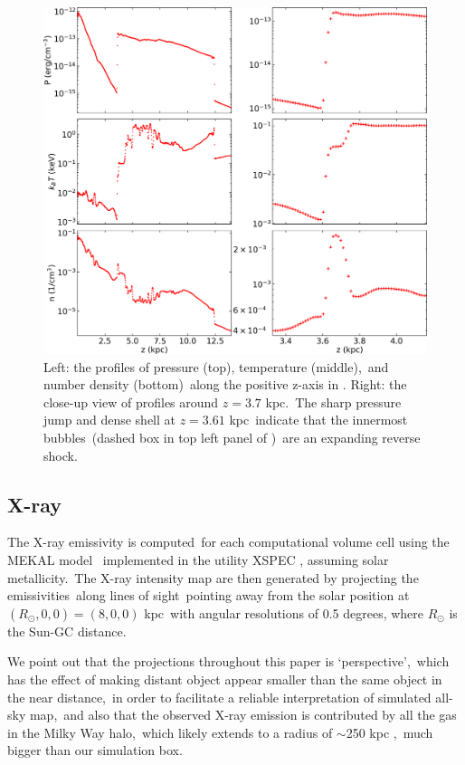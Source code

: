 \documentclass[twocolumn]{aastex631}
\begin{document}
  \begin{figure}
    \includegraphics[width=\columnwidth]{figures/fig__profile.png}
    \caption{
             Left: the profiles of pressure (top), temperature (middle),\
             and number density (bottom)\
             along the positive z-axis in .
             Right: the close-up view of profiles around $z=3.7$ kpc.\
             The sharp pressure jump and dense shell at $z=3.61$ kpc\
             indicate that the innermost bubbles\
             (dashed box in top left panel of )\
             are an expanding reverse shock.\
     }
    \label{fig__profile}
  \end{figure}

  \subsection{X-ray}
  \label{X-ray}
  The X-ray emissivity is computed\
  for each computational volume cell
  using the MEKAL model \citep{Xray-1,Xray-2,Xray-3}\
  implemented in the utility XSPEC \citep{XSPEC}, assuming solar metallicity.\
  The X-ray intensity map are then generated by projecting the emissivities\
  along lines of sight\
  pointing away from the solar position at $(R_{\odot},0,0)=(8,0,0)$ kpc\
  with angular resolutions of 0.5 degrees, where $R_{\odot}$ is the Sun-GC distance.

  We point out that the projections throughout this paper is \lq perspective\rq,\
  which has the effect of making distant object appear smaller than the same object in the near distance,\
  in order to facilitate a reliable interpretation of simulated all-sky map,\
  and also that the observed X-ray emission is contributed by all the gas in the Milky Way halo,\
  which likely extends to a radius of $\sim$250 kpc \citep{halo-radius-1,halo-radius-2},\
  much bigger than our simulation box.
\end{document}
